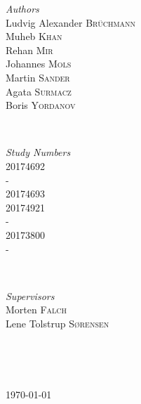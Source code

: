 \documentclass[12p]{article}
\begin{document}
\begin{titlepage}
	\begin{minipage}{0.4\textwidth}
    \begin{flushleft} \large
    \emph{Authors}\\
        Ludvig Alexander \textsc{Brüchmann} \\
        Muheb \textsc{Khan} \\
    	Rehan \textsc{Mir} \\
    	Johannes \textsc{Mols} \\
    	Martin \textsc{Sander} \\
    	Agata \textsc{Surmacz} \\
    	Boris \textsc{Yordanov} \\
    \end{flushleft}
    \end{minipage}
    ~
    \begin{minipage}{0.4\textwidth}
    \begin{flushright} \large
    \emph{Study Numbers} \\
        20174692 \\
        - \\
        20174693 \\
        20174921 \\
        - \\
        20173800 \\
        - \\
    \end{flushright}
    \end{minipage}\\[0.5cm]
    
    
    \begin{minipage}{0.4\textwidth}
    \begin{flushleft} \large
    \emph{Supervisors}\\
        Morten \textsc{Falch} \\
        Lene Tolstrup \textsc{Sørensen} \\
    \end{flushleft}
    \end{minipage}
    ~
    \begin{minipage}{0.4\textwidth}
    \begin{flushright} \large
    \end{flushright}
    \end{minipage}\\[0.5cm]

	
	\vfill\vfill\vfill %
	
	{\large\today} %
	
    
\end{titlepage}
\end{document}
